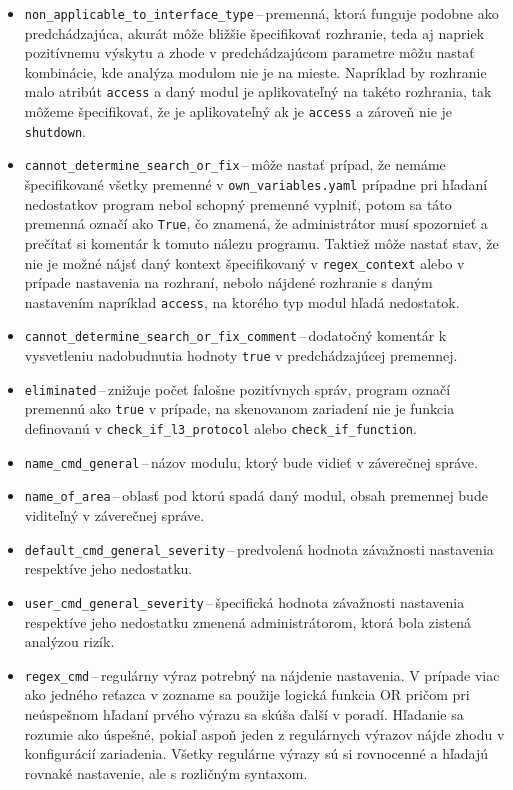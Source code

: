 \begin{itemize}
	\item \texttt{non\_applicable\_to\_interface\_type}\,--\,premenná, ktorá funguje podobne ako predchádzajúca, akurát môže bližšie špecifikovať rozhranie, teda aj napriek pozitívnemu výskytu a zhode v predchádzajúcom parametre môžu nastať kombinácie, kde analýza modulom nie je na mieste. Napríklad by rozhranie malo atribút \texttt{access} a daný modul je aplikovateľný na takéto rozhrania, tak môžeme špecifikovať, že je aplikovateľný ak je \texttt{access} a zároveň nie je \texttt{shutdown}.
	\item \texttt{cannot\_determine\_search\_or\_fix}\,--\,môže nastať prípad, že nemáme špecifikované všetky premenné v \texttt{own\_variables.yaml} prípadne pri hľadaní nedostatkov program nebol schopný premenné vyplniť, potom sa táto premenná označí ako \texttt{True}, čo znamená, že administrátor musí spozornieť a prečítať si komentár k tomuto nálezu programu. Taktiež môže nastať stav, že nie je možné nájsť daný kontext špecifikovaný v \texttt{regex\_context} alebo v prípade nastavenia na rozhraní, nebolo nájdené rozhranie s daným nastavením napríklad \texttt{access}, na ktorého typ modul hľadá nedostatok.
	\item \texttt{cannot\_determine\_search\_or\_fix\_comment}\,--\,dodatočný komentár k vysvetleniu nadobudnutia hodnoty \texttt{true} v predchádzajúcej premennej.
	\item \texttt{eliminated}\,--\,znižuje počet falošne pozitívnych správ, program označí premennú ako \texttt{true} v prípade, na skenovanom zariadení nie je funkcia definovanú v \texttt{check\_if\_l3\_protocol} alebo \texttt{check\_if\_function}.
	\item \texttt{name\_cmd\_general}\,--\,názov modulu, ktorý bude vidieť v záverečnej správe.
	\item \texttt{name\_of\_area}\,--\,oblasť pod ktorú spadá daný modul, obsah premennej bude viditeľný v záverečnej správe.
	\item \texttt{default\_cmd\_general\_severity}\,--\,predvolená hodnota závažnosti nastavenia respektíve jeho nedostatku. 
	\item \texttt{user\_cmd\_general\_severity}\,--\,špecifická hodnota závažnosti nastavenia respektíve jeho nedostatku zmenená administrátorom, ktorá bola zistená analýzou rizík. 
	\item \texttt{regex\_cmd}\,--\,regulárny výraz potrebný na nájdenie nastavenia. V prípade viac ako jedného reťazca v zozname sa použije logická funkcia OR pričom pri neúspešnom hľadaní prvého výrazu sa skúša ďalší v poradí. Hľadanie sa rozumie ako úspešné, pokiaľ aspoň jeden z regulárnych výrazov nájde zhodu v konfigurácií zariadenia. Všetky regulárne výrazy sú si rovnocenné a hľadajú rovnaké nastavenie, ale s rozličným syntaxom.

\end{itemize}
